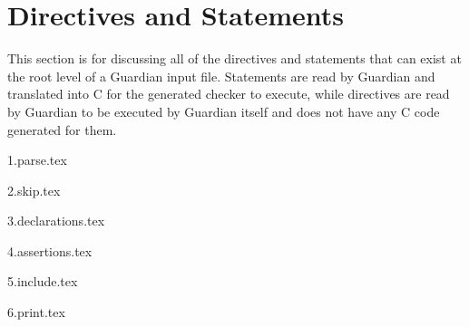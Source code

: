 
\section{Directives and Statements}
{
	This section is for discussing all of the
	directives and statements that can
	exist at the root level of a Guardian input file.
	Statements are read by Guardian and translated into C
	for the generated checker to
	execute, while directives are read by Guardian to be
	executed by Guardian itself
	and does not have any C code generated for them.
	
	{1.parse.tex}
	
	{2.skip.tex}
	
	{3.declarations.tex}
	
	{4.assertions.tex}
	
	{5.include.tex}
	
	{6.print.tex}
}

